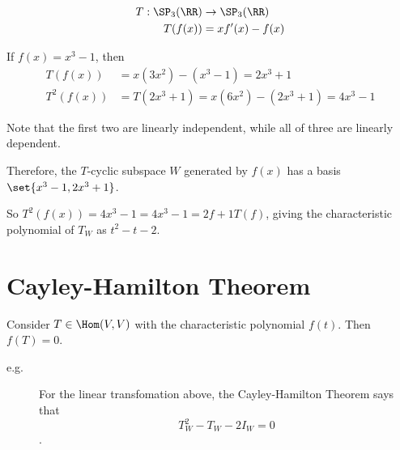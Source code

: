 \documentclass[11pt]{scrartcl}
\begin{document}
  \begin{example}

    \begin{align}
      T: \SP_3(\RR) & \to \SP_3(\RR) \\
      T(f(x))       & = xf'(x) - f(x)
    \end{align}

    If $f(x) = x^{3} - 1$, then
    \begin{align}
      T(f(x)) &= x(3x^{2}) - (x^3-1) = 2x^{3} +1\\
      T^{2}(f(x)) &= T(2x^3+1) = x (6x^2) - (2x^3+ 1) = 4x^3-1
    \end{align}

    Note that the first two are linearly independent, while all of
    three are linearly dependent.

    Therefore, the $T$-cyclic subspace $W$ generated by $f(x)$ has a
    basis $\set{x^3-1, 2x^3+1}$.

    So $T^2(f(x)) = 4x^3-1 = 4x^{3} -1 = 2f + 1T(f)$, giving the
    characteristic polynomial of $T_W$ as $t^2-t - 2$.
  \end{example}
\section{Cayley-Hamilton Theorem}
  \begin{theorem}
    Consider $T\in \Hom(V,V)$ with the characteristic polynomial
    $f(t)$. Then $f(T) = 0$.
  \end{theorem}

  \begin{description}
  \item[e.g.]  For the linear transfomation above, the Cayley-Hamilton
    Theorem says that \[T^2_W - T_{W} - 2I_{W} = 0\].
  \end{description}
\end{document}
